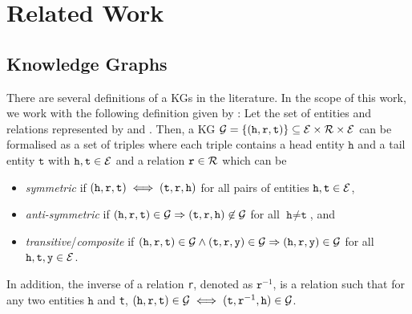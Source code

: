 \chapter{Related Work}
\label{ch:relatedwork}

\section{Knowledge Graphs} 
There are several definitions of a \acp{KG} in the literature. 
In the scope of this work, we work with the following definition given by \cite{ConEx, RotatE}:
Let the set of entities and relations represented by \entities and \relations.
Then, a \ac{KG} $\mathcal{G}= \{(\texttt{h}, \texttt{r}, \texttt{t}) \}  \subseteq \mathcal{E} \times \mathcal{R} \times \mathcal{E}$ can be formalised as a set of triples where each triple contains a head entity $\texttt{h}$ and a tail entity $\texttt{t}$ with $\texttt{h}, \texttt{t} \in \mathcal{E}$ and a relation $\texttt{r} \in \mathcal{R}$ which can be
\begin{itemize}
    \item 
    \emph{symmetric} if $(\texttt{h}, \texttt{r}, \texttt{t}) \iff (\texttt{t}, \texttt{r}, \texttt{h})$ for all pairs of entities $\texttt{h},\texttt{t}\in \mathcal{E}$, 
   
   \item 
   \emph{anti-symmetric} if $(\texttt{h}, \texttt{r}, \texttt{t}) \in \mathcal{G} \Rightarrow (\texttt{t}, \texttt{r}, \texttt{h}) \not \in \mathcal{G}$ for all $\texttt{h} \not= \texttt{t}$, and
    
    \item 
    \emph{transitive}/\emph{composite} if $(\texttt{h}, \texttt{r}, \texttt{t})\in\mathcal{G} \wedge (\texttt{t}, \texttt{r}, \texttt{y}) \in \mathcal{G}  \Rightarrow (\texttt{h}, \texttt{r}, \texttt{y}) \in \mathcal{G}$ for all $\texttt{h},\texttt{t},\texttt{y}\in \mathcal{E}$.
\end{itemize}
In addition, the inverse of a relation \texttt{r}, denoted as $\texttt{r}^{-1}$, is a relation such that for any two entities $\texttt{h}$ and \texttt{t}, $(\texttt{h}, \texttt{r}, \texttt{t}) \in \mathcal{G} \iff (\texttt{t},\texttt{r}^{-1},\texttt{h}) \in \mathcal{G} $.






